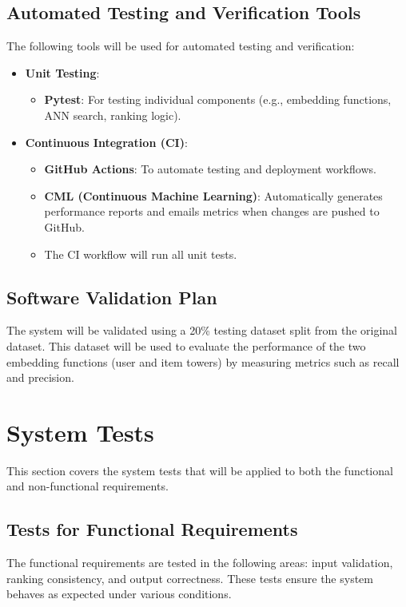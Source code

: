 \documentclass[12pt, titlepage]{article}
\begin{document}
\subsection{Automated Testing and Verification Tools}
The following tools will be used for automated testing and verification:
\begin{itemize}
\item \textbf{Unit Testing}:
\begin{itemize}
\item \textbf{Pytest}: For testing individual components (e.g., embedding functions, ANN search, ranking logic).
\end{itemize}
\item \textbf{Continuous Integration (CI)}:
\begin{itemize}
\item \textbf{GitHub Actions}: To automate testing and deployment workflows.
\item \textbf{CML (Continuous Machine Learning)}: Automatically generates performance reports and emails metrics when changes are pushed to GitHub.
\item The CI workflow will run all unit tests.
\end{itemize}
\end{itemize}

\subsection{Software Validation Plan}

The system will be validated using a 20\% testing dataset split from the original dataset. This dataset will be used to evaluate the performance of the two embedding functions (user and item towers) by measuring metrics such as recall and precision.

\section{System Tests}\label{SystemTest}

This section covers the system tests that will be applied to both the functional and non-functional requirements.

\subsection{Tests for Functional Requirements}

The functional requirements are tested in the following areas: input validation, ranking consistency, and output correctness. These tests ensure the system behaves as expected under various conditions.
\end{document}
